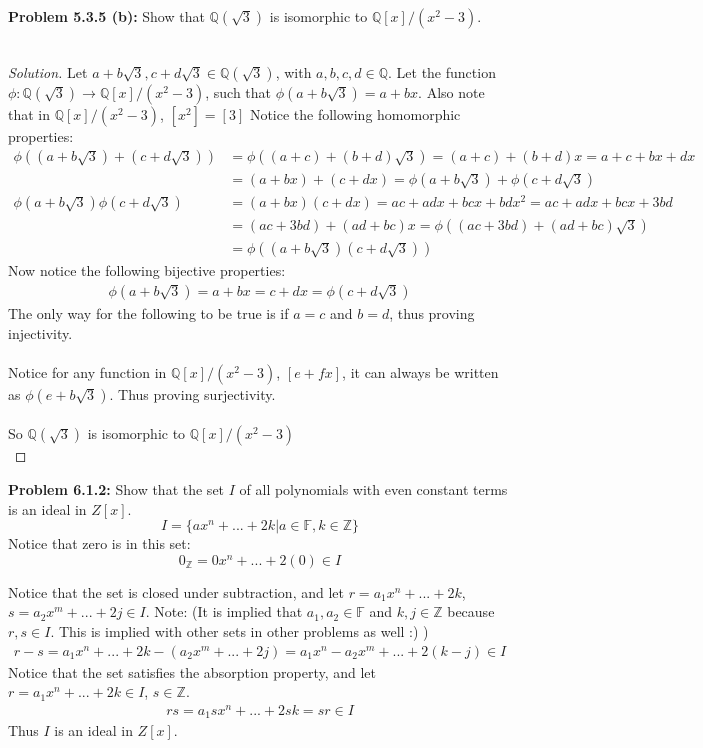 \documentclass[12pt]{article}
\begin{document}
\noindent \textbf{Problem 5.3.5 (b): }Show that $\mathbb{Q}(\sqrt{3})$ is isomorphic to $\mathbb{Q}[x]/(x^2 - 3)$.
\\ \\
	\begin{proof}[Solution]
	Let $a + b\sqrt{3}, c + d\sqrt{3} \in \mathbb{Q}(\sqrt{3})$, with $a,b,c,d \in \mathbb{Q}$.  Let the function $\phi: \mathbb{Q}(\sqrt{3}) \rightarrow \mathbb{Q}[x]/(x^2 - 3)$, such that $\phi(a + b\sqrt{3}) = a + bx$. Also note that in $\mathbb{Q}[x]/(x^2 - 3)$, $[x^2] = [3]$  Notice the following homomorphic properties:
		\begin{align*}
			\phi((a + b\sqrt{3}) + (c + d\sqrt{3})) &= \phi((a+c) + (b + d)\sqrt{3}) = (a+c) + (b+d)x = a + c + bx + dx \\
			&= (a + bx) + (c + dx) = \phi(a + b\sqrt{3}) + \phi(c + d\sqrt{3}) \\
			\phi(a + b\sqrt{3})\phi(c + d\sqrt{3}) &= (a + bx)(c + dx) = a c + a d x + b c x + b dx^2 = a c + a d x + b c x + 3b d \\
			&= (ac + 3bd) + (ad + bc)x = \phi((ac + 3bd) + (ad + bc)\sqrt{3}) \\
			&= \phi((a + b\sqrt{3})(c + d\sqrt{3}))
		\end{align*}
	Now notice the following bijective properties:
		\begin{align*}
			\phi(a + b\sqrt{3}) = a + bx = c + dx = \phi(c + d\sqrt{3})
		\end{align*}
	The only way for the following to be true is if $a = c$ and $b = d$, thus proving injectivity.
	\\ \\
	Notice for any function in $\mathbb{Q}[x]/(x^2 - 3)$, $[e + fx]$, it can always be written as $\phi(e + b\sqrt{3})$.  Thus proving surjectivity. 
	\\ \\
	So $\mathbb{Q}(\sqrt{3})$ is isomorphic to $\mathbb{Q}[x]/(x^2 - 3)$ \\
	\end{proof}

\newpage 

\noindent \textbf{Problem 6.1.2: }Show that the set $I$ of all polynomials with even constant terms is an ideal in
$Z[x]$.
	$$
	I = \{ax^n + ... + 2k | a \in \mathbb{F}, k \in \mathbb{Z}\}
	$$ 
	Notice that zero is in this set:
		$$
		0_\mathbb{Z} = 0x^n + ... + 2(0)\in I
		$$ 

	\noindent Notice that the set is closed under subtraction, and let $r = a_1x^n + ... + 2k$, $s = a_2x^m + ... + 2j \in I$. Note: (It is implied that $a_1,a_2 \in \mathbb{F}$ and $k,j \in \mathbb{Z}$ because $r,s \in I$.  This is implied with other sets in other problems as well :) )
		\begin{align*}
			r  - s = a_1x^n + ... + 2k - (a_2x^m + ... + 2j) = a_1x^n - a_2x^m + ... + 2(k - j) \in I
		\end{align*}
	Notice that the set satisfies the absorption property, and let $r = a_1x^n + ... + 2k \in I$, $s \in \mathbb{Z}$.
		\begin{align*}
			rs = a_1sx^n + ... + 2sk = sr \in I
		\end{align*}
	Thus $I$ is an ideal in $Z[x]$.
\end{document}
